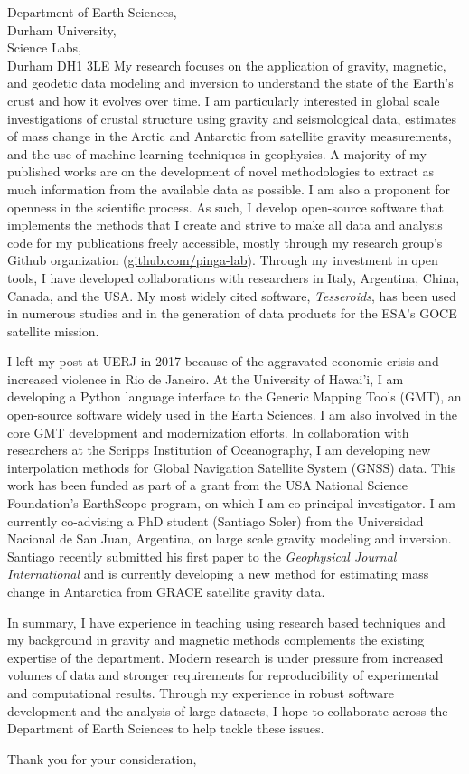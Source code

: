 \documentclass[11pt]{letter}
\begin{document}
\begin{letter}{
        Department of Earth Sciences,  \\
        Durham University, \\
        Science Labs, \\
        Durham DH1 3LE
}
My research focuses on the application of gravity, magnetic, and geodetic data modeling
and inversion to understand the state of the Earth's crust and how it evolves over time.
I am particularly interested in global scale investigations of crustal structure using
gravity and seismological data,
estimates of mass change in the Arctic and Antarctic from satellite gravity measurements,
and the use of machine learning techniques in geophysics.
A majority of my published works are on the development of novel methodologies to
extract as much information from the available data as possible.
I am also a proponent for openness in the scientific process.
As such, I develop open-source software that implements the methods that I create and
strive to make all data and analysis code for my publications freely accessible,
mostly through my research group's Github organization
(\href{https://github.com/pinga-lab}{github.com/pinga-lab}).
Through my investment in open tools, I have developed collaborations with
researchers in Italy, Argentina, China, Canada, and the USA.
My most widely cited software, \textit{Tesseroids}, has been used in numerous studies and
in the generation of data products for the ESA's GOCE satellite mission.

I left my post at UERJ in 2017 because of the aggravated economic crisis and increased
violence in Rio de Janeiro.
At the University of Hawai'i, I am developing a Python language interface to the Generic
Mapping Tools (GMT), an open-source software widely used in the Earth Sciences.
I am also involved in the core GMT development and modernization efforts.
In collaboration with researchers at the Scripps Institution of Oceanography, I am
developing new interpolation methods for Global Navigation Satellite System (GNSS) data.
This work has been funded as part of a grant from the USA National Science Foundation's
EarthScope program, on which I am co-principal investigator.
I am currently
co-advising a PhD student (Santiago Soler) from the Universidad Nacional de San Juan,
Argentina, on large scale gravity modeling and inversion.
Santiago recently submitted his first paper to the \textit{Geophysical Journal
International} and is currently developing a new method for estimating mass change in
Antarctica from GRACE satellite gravity data.

In summary, I have experience in teaching using research based techniques and my
background in gravity and magnetic methods complements the existing expertise of the
department.
Modern research is under pressure from increased volumes of data and stronger
requirements for reproducibility of experimental and computational results.
Through my experience in robust software development and the analysis of large datasets,
I hope to collaborate across the Department of Earth Sciences to help tackle these
issues.


\closing{Thank you for your consideration,}


\end{letter}
\end{document}
